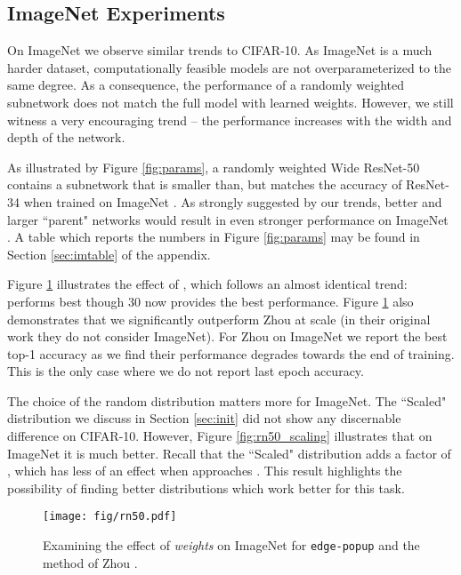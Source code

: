 \documentclass[10pt,twocolumn,letterpaper]{article}
\newcommand{\alg}{\texttt{edge-popup} }
\begin{document}
\subsection{ImageNet \cite{imagenet} Experiments}\label{sec:imagenet}

On ImageNet we observe similar trends to CIFAR-10. As ImageNet is a much harder dataset, computationally feasible models are not overparameterized to the same degree. As a consequence, the performance of a randomly weighted subnetwork does not match the full model with learned weights.
However, we still witness a very encouraging trend -- the performance increases with the width and depth of the network. 

As illustrated by Figure \ref{fig:params}, a randomly weighted Wide ResNet-50 contains a subnetwork that is smaller than, but matches the accuracy of ResNet-34 when trained on ImageNet \cite{imagenet}. As strongly suggested by our trends, better and larger ``parent" networks would result in even stronger performance on ImageNet \cite{imagenet}. A table which reports the numbers in Figure \ref{fig:params} may be found in Section \ref{sec:imtable} of the appendix.

Figure \ref{fig:rn50} illustrates the effect of , which follows an almost identical trend:  performs best though 30 now provides the best performance. Figure \ref{fig:rn50} also demonstrates that we significantly outperform Zhou \etal at scale (in their original work they do not consider ImageNet). For Zhou \etal on ImageNet we report the best top-1 accuracy as we find their performance degrades towards the end of training. This is the only case where we do not report last epoch accuracy.

The choice of the random distribution matters more for ImageNet. The ``Scaled" distribution we discuss in Section \ref{sec:init} did not show any discernable difference on CIFAR-10. However, Figure \ref{fig:rn50_scaling} illustrates that on ImageNet it is much better. Recall that the ``Scaled"
 distribution adds a factor of , which has less of an effect when  approaches . This result highlights the possibility of finding better distributions which work better for this task.

\begin{figure}[t]
\begin{center}
\texttt{[image: fig/rn50.pdf]}
\end{center}
  \caption{Examining the effect of  \textit{weights} on ImageNet for \alg and the method of Zhou \etal.}
\label{fig:rn50}
\end{figure}
\end{document}
